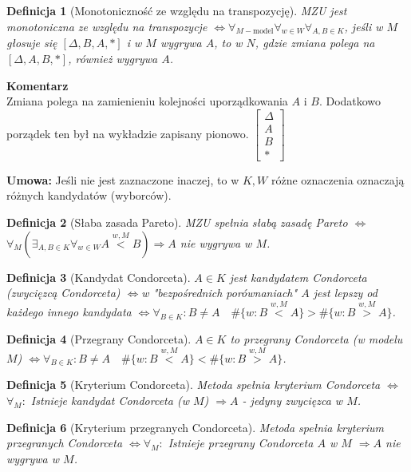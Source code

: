 \documentclass[12pt,a4paper]{article}
\theoremstyle{break}
\newcommand{\Komentarz}[1]{
	\begin{mdframed}[style=zadanie]
		\textbf{Komentarz}\\
		#1
	\end{mdframed}
	}
\newtheorem{definition}{Definicja}[section]
\newcommand{\witw}{$\Leftrightarrow$}
\begin{document}
		\begin{definition}[Monotoniczność ze względu na transpozycję]
			MZU jest monotoniczna ze względu na transpozycje \witw $\forall_{M-\text{model}} \forall_{w\in W} \forall_{A,B\in K}$, jeśli w $M$ głosuje się $[\Delta, B, A, *]$ i w $M$ wygrywa $A$, to w $N$, gdzie zmiana polega na $[\Delta, A, B, *]$, również wygrywa $A$.
		\end{definition}
		
		\Komentarz{Zmiana polega na zamienieniu kolejności uporządkowania $A$ i $B$. Dodatkowo porządek ten był na wykładzie zapisany pionowo. $\begin{bmatrix}
				\Delta\\
				A\\
				B\\
				*
			\end{bmatrix}$
		}
		
		{\textbf{Umowa:}} Jeśli nie jest zaznaczone inaczej, to w $K,W$ różne oznaczenia oznaczają różnych kandydatów (wyborców).
		
		\begin{definition}[Słaba zasada Pareto]
			MZU spełnia słabą zasadę Pareto \witw $\forall_M (\exists_{A,B\in K}\forall_{w\in W} A\overset{w,M}{<}B) \Rightarrow A$ nie wygrywa w $M$.
		\end{definition}
		
		\begin{definition}[Kandydat Condorceta]
			$A\in K$ jest kandydatem Condorceta (zwycięzcą Condorceta) \witw w "bezpośrednich porównaniach" $A$ jest lepszy od każdego innego kandydata \witw $\forall_{B \in K}: B\neq A \quad \#\{w: B\overset{w,M}{<}A\}>\#\{w: B\overset{w,M}{>}A\}$.
		\end{definition}
		
		\begin{definition}[Przegrany Condorceta]
			$A\in K$ to przegrany Condorceta (w modelu $M$) \witw $\forall_{B \in K}: B\neq A \quad\#\{w: B\overset{w,M}{<}A\}<\#\{w: B\overset{w,M}{>}A\}$.
		\end{definition}
		
		\begin{definition}[Kryterium Condorceta]
			Metoda spełnia kryterium Condorceta \witw $\forall_M:$ Istnieje kandydat Condorceta (w $M$) $\Rightarrow A$ - jedyny zwycięzca w $M$.
		\end{definition}
		
		\begin{definition}[Kryterium przegranych Condorceta]			
			Metoda spełnia kryterium przegranych Condorceta \witw $\forall_M:$ Istnieje przegrany Condorceta $A$ w $M$ $\Rightarrow A$ nie wygrywa w $M$.
		\end{definition}
		
\end{document}

